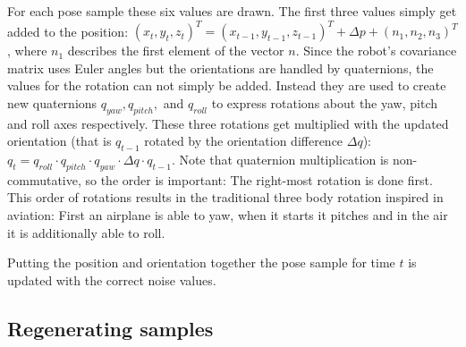 \documentclass[Thesis.tex]{subfiles}
\begin{document}
For each pose sample these six values are drawn. The first three values simply get added to the position: $(x_t, y_t, z_t)^T = (x_{t-1}, y_{t-1}, z_{t-1})^T + \Delta p + (n_1, n_2, n_3)^T$, where $n_1$ describes the first element of the vector $n$.
Since the robot's covariance matrix uses Euler angles but the orientations are handled by quaternions, the values for the rotation can not simply be added. Instead they are used to create new quaternions $q_{yaw}, q_{pitch},$ and $q_{roll}$ to express rotations about the yaw, pitch and roll axes respectively. These three rotations get multiplied with the updated orientation (that is $q_{t-1}$ rotated by the orientation difference $\Delta q$): $q_{t} = q_{roll} \cdot q_{pitch} \cdot q_{yaw} \cdot \Delta q \cdot q_{t-1}$. Note that quaternion multiplication is non-commutative, so the order is important: The right-most rotation is done first. This order of rotations results in the traditional three body rotation inspired in aviation: First an airplane is able to yaw, when it starts it pitches and in the air it is additionally able to roll.

Putting the position and orientation together the pose sample for time $t$ is updated with the correct noise values.

\subsection{Regenerating samples}
\end{document}
